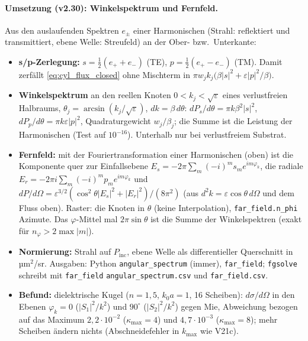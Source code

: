 \paragraph{Umsetzung (v2.30): Winkelspektrum und Fernfeld.}
Aus den auslaufenden Spektren $e_\pm$ einer Harmonischen (Strahl: reflektiert und transmittiert, ebene Welle:
Streufeld) an der Ober- bzw.\ Unterkante:
\begin{itemize}[nosep]
  \item \textbf{s/p-Zerlegung:} $s=\tfrac12(e_++e_-)$ (TE), $p=\tfrac12(e_+-e_-)$ (TM). Damit zerfällt
        \eqref{eq:cyl_flux_closed} ohne Mischterm in $\pi w_jk_j\big(\beta|s|^2+\varepsilon|p|^2/\beta\big)$.
  \item \textbf{Winkelspektrum} an den reellen Knoten $0<k_j<\sqrt\varepsilon$ eines verlustfreien Halbraums,
        $\theta_j=\arcsin(k_j/\sqrt\varepsilon)$, $dk=\beta\,d\theta$:
        $dP_s/d\theta=\pi k\beta^2|s|^2$, $dP_p/d\theta=\pi k\varepsilon|p|^2$, Quadraturgewicht $w_j/\beta_j$; die Summe ist
        die Leistung der Harmonischen (Test auf $10^{-16}$). Unterhalb nur bei verlustfreiem Substrat.
  \item \textbf{Fernfeld:} mit der Fouriertransformation einer Harmonischen (oben) ist die Komponente quer zur
        Einfallsebene $E_s=-2\pi\sum_m(-i)^ms_me^{im\varphi_k}$, die radiale $E_r=-2\pi i\sum_m(-i)^mp_me^{im\varphi_k}$ und
        $dP/d\Omega=\varepsilon^{3/2}(\cos^2\theta|E_s|^2+|E_r|^2)/(8\pi^2)$ (aus $d^2k=\varepsilon\cos\theta\,d\Omega$ und dem
        Fluss oben). Raster: die Knoten in $\theta$ (keine Interpolation), \verb|far_field.n_phi| Azimute. Das
        $\varphi$-Mittel mal $2\pi\sin\theta$ ist die Summe der Winkelspektren (exakt für $n_\varphi>2\max|m|$).
  \item \textbf{Normierung:} Strahl auf $P_{\text{inc}}$, ebene Welle als differentieller Querschnitt in µm$^2$/sr.
        Ausgaben: Python \verb|angular_spectrum| (immer), \verb|far_field|; \verb|fgsolve| schreibt mit
        \verb|far_field| \verb|angular_spectrum.csv| und \verb|far_field.csv|.
  \item \textbf{Befund:} dielektrische Kugel ($n=1{,}5$, $k_0a=1$, 16 Scheiben): $d\sigma/d\Omega$ in den Ebenen
        $\varphi_k=0$ ($|S_1|^2/k^2$) und $90^\circ$ ($|S_2|^2/k^2$) gegen Mie, Abweichung bezogen auf das Maximum
        $2{,}2\cdot10^{-2}$ ($\kappa_{\max}=4$) und $4{,}7\cdot10^{-3}$ ($\kappa_{\max}=8$); mehr Scheiben ändern nichts
        (Abschneidefehler in $k_{\max}$ wie V21c).
\end{itemize}

